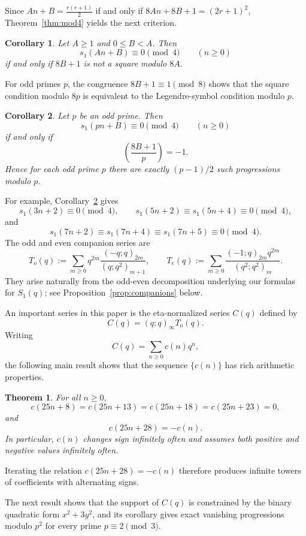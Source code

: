 \documentclass[reqno]{amsart}
\theoremstyle{plain}
\newtheorem{theorem}{Theorem}
\newtheorem{corollary}{Corollary}
\theoremstyle{definition}
\theoremstyle{remark}
\numberwithin{equation}{section}
\newcommand{\qpochn}[3]{(#1;#2)_{#3}}
\begin{document}
Since $An+B=\frac{r(r+1)}{2}$ if and only if $8An+8B+1=(2r+1)^2$, Theorem~\ref{thm:mod4} yields the next criterion.
\begin{corollary}\label{cor:progressions}
Let $A\ge 1$ and $0\le B<A$. Then
\[
s_1(An+B)\equiv 0\pmod{4}\qquad(n\ge 0)
\]
if and only if $8B+1$ is not a square modulo $8A$.
\end{corollary}

For odd primes $p$, the congruence $8B+1\equiv 1\pmod{8}$ shows that the square condition modulo $8p$ is equivalent to the Legendre-symbol condition modulo $p$.
\begin{corollary}\label{cor:prime-modulus}
Let $p$ be an odd prime. Then
\[
s_1(pn+B)\equiv 0\pmod{4}\qquad(n\ge 0)
\]
if and only if
\[
\left(\frac{8B+1}{p}\right)=-1.
\]
Hence for each odd prime $p$ there are exactly $(p-1)/2$ such progressions modulo $p$.
\end{corollary}

For example, Corollary~\ref{cor:prime-modulus} gives
\[
s_1(3n+2)\equiv 0\pmod{4},
\qquad
s_1(5n+2)\equiv s_1(5n+4)\equiv 0\pmod{4},
\]
and
\[
s_1(7n+2)\equiv s_1(7n+4)\equiv s_1(7n+5)\equiv 0\pmod{4}.
\]
%
The odd and even companion series are
\[
T_o(q):=\sum_{m\ge 0} q^{2m}\frac{\qpochn{-q}{q}{2m}}{\qpochn{q}{q^2}{m+1}},
\qquad
T_e(q):=\sum_{m\ge 0}\frac{\qpochn{-1}{q}{2m}q^{2m}}{\qpochn{q^2}{q^2}{m}}.
\]
They arise naturally from the odd-even decomposition underlying our formulas for $S_1(q)$; see Proposition~\ref{prop:companions} below.

An important series in this paper is the eta-normalized series $C(q)$ defined by
\begin{equation}\label{eta-normal}
C(q)=(q;q)_\infty T_o(q).
\end{equation}
Writing
\[
C(q)=\sum_{n\geq 0}c(n) q^n,
\]
the following main result shows that the sequence $\{c(n)\}$ has rich arithmetic properties.
\begin{theorem}\label{thm:C-recursions}
For all $n\ge 0$,
\[
c(25n+8)=c(25n+13)=c(25n+18)=c(25n+23)=0,
\]
and
\[
c(25n+28)=-c(n).
\]
In particular, $c(n)$ changes sign infinitely often and assumes both positive and negative values infinitely often.
\end{theorem}
Iterating the relation \(c(25n+28)=-c(n)\) therefore produces infinite towers of coefficients with alternating signs.

The next result shows that the support of $C(q)$ is constrained by the binary quadratic form $x^2+3y^2$,
and its corollary gives exact vanishing progressions modulo $p^2$ for every prime $p\equiv 2\pmod{3}$.
\end{document}
